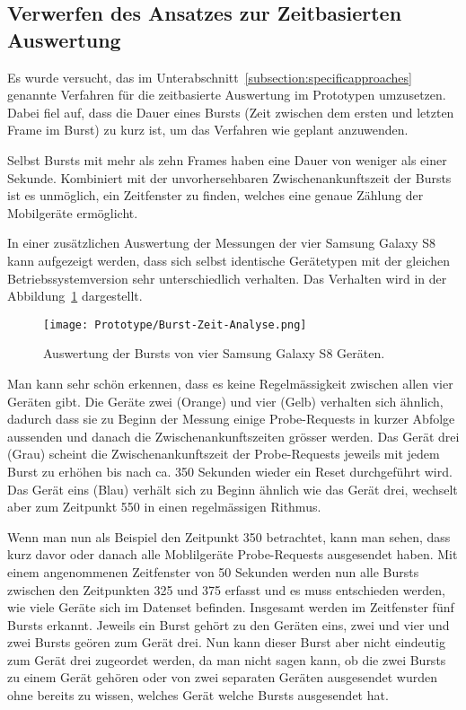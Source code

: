 \clearpage

\subsection{Verwerfen des Ansatzes zur Zeitbasierten Auswertung
\label{subsection:timefilter}}
Es wurde versucht, das im Unterabschnitt~\ref{subsection:specificapproaches} 
genannte Verfahren für die zeitbasierte Auswertung im Prototypen umzusetzen.
Dabei fiel auf, dass die Dauer eines Bursts (Zeit zwischen dem ersten und 
letzten Frame im Burst) zu kurz ist, um das Verfahren wie geplant anzuwenden.

Selbst Bursts mit mehr als zehn Frames haben eine Dauer von weniger als einer 
Sekunde. Kombiniert mit der unvorhersehbaren Zwischenankunftszeit der Bursts 
ist es unmöglich, ein Zeitfenster zu finden, welches eine genaue Zählung der 
Mobilgeräte ermöglicht.

In einer zusätzlichen Auswertung der Messungen der vier Samsung Galaxy S8 
kann aufgezeigt werden, dass sich selbst identische Gerätetypen mit der 
gleichen Betriebssystemversion sehr unterschiedlich verhalten. 
Das Verhalten wird in der Abbildung~\ref{figure:bursttimeanalysis} dargestellt.

\begin{figure}[h!]
    \centering
    \texttt{[image: Prototype/Burst-Zeit-Analyse.png]}
    \caption{Auswertung der Bursts von vier Samsung Galaxy S8 Geräten.
    \label{figure:bursttimeanalysis}}
\end{figure}

Man kann sehr schön erkennen, dass es keine Regelmässigkeit zwischen allen vier 
Geräten gibt. Die Geräte zwei (Orange) und vier (Gelb) verhalten sich ähnlich, 
dadurch dass sie zu Beginn der Messung einige Probe-Requests in kurzer Abfolge 
aussenden und danach die Zwischenankunftszeiten grösser werden.
Das Gerät drei (Grau) scheint die Zwischenankunftszeit der Probe-Requests jeweils 
mit jedem Burst zu erhöhen bis nach ca. 350 Sekunden wieder ein Reset durchgeführt 
wird.
Das Gerät eins (Blau) verhält sich zu Beginn ähnlich wie das Gerät drei, 
wechselt aber zum Zeitpunkt 550 in einen regelmässigen Rithmus.

\clearpage

Wenn man nun als Beispiel den Zeitpunkt 350 betrachtet, kann man sehen, dass 
kurz davor oder danach alle Moblilgeräte Probe-Requests ausgesendet haben. 
Mit einem angenommenen Zeitfenster von 50 Sekunden werden nun alle Bursts 
zwischen den Zeitpunkten 325 und 375 erfasst und es muss entschieden werden,
wie viele Geräte sich im Datenset befinden. Insgesamt werden im Zeitfenster
fünf Bursts erkannt. Jeweils ein Burst gehört zu den Geräten eins, zwei und vier 
und zwei Bursts geören zum Gerät drei. Nun kann dieser Burst aber nicht eindeutig 
zum Gerät drei zugeordet werden, da man nicht sagen kann, ob die zwei Bursts 
zu einem Gerät gehören oder von zwei separaten Geräten ausgesendet wurden ohne
bereits zu wissen, welches Gerät welche Bursts ausgesendet hat.   

